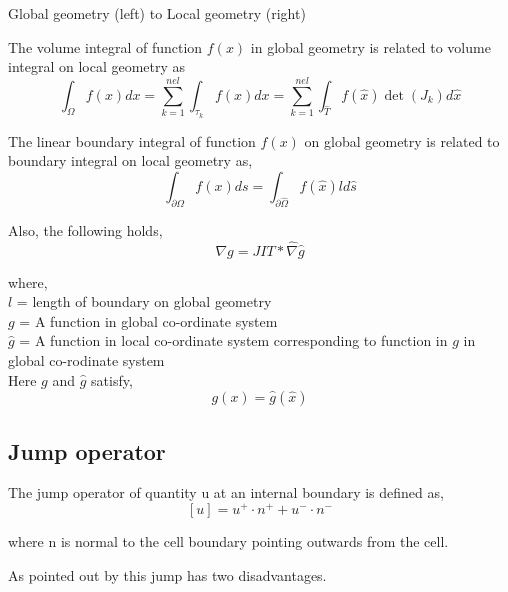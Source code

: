 \documentclass[a4paper,12pt]{book}
\begin{document}
\begin{center}
Global geometry (left) to Local geometry (right)
\end{center}

The volume integral of function $f(x)$ in global geometry is related to volume integral on local geometry as 
\begin{equation}\label{integral_local_global_volume}
\int_\Omega f(x) dx = \sum_{k=1}^{nel} \int_{\tau_k} f(x) dx = \sum_{k=1}^{nel} \int_{\hat{T}} f(\hat{x}) \det(J_k) d \hat{x}
\end{equation}

The linear boundary integral of function $f(x)$ on global geometry is related to boundary integral on local geometry as, 
\begin{equation}\label{integral_local_global_boundary}
\int_{\partial\Omega} f(x) ds = \int_{\partial\hat{\Omega}} f(\hat{x}) l d \hat{s}
\end{equation}

Also, the following holds,
\begin{equation}\label{derivative_transformation}
\nabla g = JIT * \hat{\nabla} \hat{g}
\end{equation}


where, \\

$l$ = length of boundary on global geometry\\
$g$  = A function in global co-ordinate system\\
$\hat{g}$  = A function in local co-ordinate system corresponding to function in $g$ in global co-rodinate system\\

Here $g$ and $\hat{g}$ satisfy,
\begin{equation}\label{func_transformation}
g(x) = \hat{g}(\hat{x})
\end{equation}

\subsection{Jump operator}

The jump operator of quantity u at an internal boundary is defined as,
\begin{equation}\label{jump operator}
[u]=u^+ \cdot n^+ + u^- \cdot n^-
\end{equation}

where n is normal to the cell boundary pointing outwards from the cell.

As pointed out by \cite{Montlaur2} this jump has two disadvantages.
\end{document}
